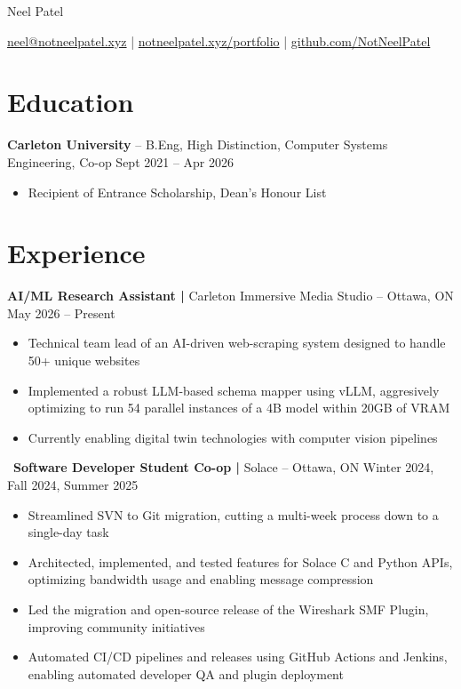 \documentclass[11pt]{article}       %
\begin{document}
\centerline{\Huge Neel Patel}

\vspace{3pt}

\centerline{\href{mailto:neel@notneelpatel.xyz}{neel@notneelpatel.xyz} | \href{https://notneelpatel.xyz/portfolio}{notneelpatel.xyz/portfolio} | \href{https://github.com/NotNeelPatel}{github.com/NotNeelPatel}}

\vspace{-10pt}

\section*{Education}
\textbf{Carleton University} -- B.Eng, High Distinction, Computer Systems Engineering, Co-op \hfill Sept 2021 -- Apr 2026 \\
\vspace{-9pt}
\begin{itemize}
	\item Recipient of Entrance Scholarship, Dean's Honour List
\end{itemize}

\vspace{-20.5pt}

\section*{Experience}
\textbf{AI/ML Research Assistant | } {Carleton Immersive Media Studio} -- Ottawa, ON \hfill May 2026 -- Present\\
\vspace{-9pt}
\begin{itemize}
  \item Technical team lead of an AI-driven web-scraping system designed to handle 50+ unique
    websites
  \item Implemented a robust LLM-based schema mapper using vLLM, aggresively optimizing to run 54 parallel instances of a 4B model within 20GB of VRAM
  \item Currently enabling digital twin technologies with computer vision pipelines
\end{itemize}

\
\textbf{Software Developer Student Co-op | } {Solace} -- Ottawa, ON \hfill Winter 2024, Fall 2024, Summer 2025\\
\vspace{-9pt}
\begin{itemize}
  \item Streamlined SVN to Git migration, cutting a multi-week process down to a single-day task
  \item Architected, implemented, and tested features for Solace C and Python APIs, optimizing bandwidth usage and enabling message compression
  \item Led the migration and open-source release of the Wireshark SMF Plugin, improving community initiatives
  \item Automated CI/CD pipelines and releases using GitHub Actions and Jenkins, enabling automated developer QA and plugin deployment
\end{itemize}
\end{document}
